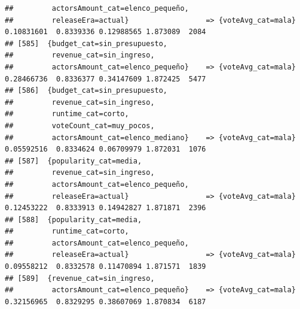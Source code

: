\documentclass[
]{article}
\begin{document}
\begin{verbatim}
##         actorsAmount_cat=elenco_pequeño,                                                                                        
##         releaseEra=actual}                  => {voteAvg_cat=mala}                0.10831601  0.8339336 0.12988565 1.873089  2084
## [585]  {budget_cat=sin_presupuesto,                                                                                             
##         revenue_cat=sin_ingreso,                                                                                                
##         actorsAmount_cat=elenco_pequeño}    => {voteAvg_cat=mala}                0.28466736  0.8336377 0.34147609 1.872425  5477
## [586]  {budget_cat=sin_presupuesto,                                                                                             
##         revenue_cat=sin_ingreso,                                                                                                
##         runtime_cat=corto,                                                                                                      
##         voteCount_cat=muy_pocos,                                                                                                
##         actorsAmount_cat=elenco_mediano}    => {voteAvg_cat=mala}                0.05592516  0.8334624 0.06709979 1.872031  1076
## [587]  {popularity_cat=media,                                                                                                   
##         revenue_cat=sin_ingreso,                                                                                                
##         actorsAmount_cat=elenco_pequeño,                                                                                        
##         releaseEra=actual}                  => {voteAvg_cat=mala}                0.12453222  0.8333913 0.14942827 1.871871  2396
## [588]  {popularity_cat=media,                                                                                                   
##         runtime_cat=corto,                                                                                                      
##         actorsAmount_cat=elenco_pequeño,                                                                                        
##         releaseEra=actual}                  => {voteAvg_cat=mala}                0.09558212  0.8332578 0.11470894 1.871571  1839
## [589]  {revenue_cat=sin_ingreso,                                                                                                
##         actorsAmount_cat=elenco_pequeño}    => {voteAvg_cat=mala}                0.32156965  0.8329295 0.38607069 1.870834  6187

\end{verbatim}
\end{document}

